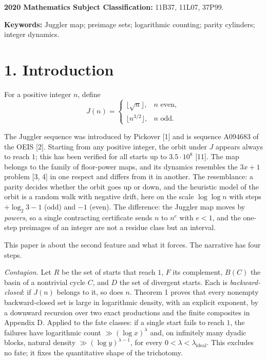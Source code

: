 \documentclass[11pt,a4paper]{article}
\begin{document}
\textbf{2020 Mathematics Subject Classification:} 11B37, 11L07, 37P99.

\textbf{Keywords:} Juggler map; preimage sets; logarithmic counting;
parity cylinders; integer dynamics.

\section{1. Introduction}\label{introduction}

For a positive integer \(n\), define \[
J(n)=\begin{cases}
\lfloor\sqrt n\rfloor,&n\text{ even},\\
\lfloor n^{3/2}\rfloor,&n\text{ odd}.
\end{cases}
\]

The Juggler sequence was introduced by Pickover {[}1{]} and is sequence
A094683 of the OEIS {[}2{]}. Starting from any positive integer, the
orbit under \(J\) appears always to reach \(1\); this has been verified
for all starts up to \(3.5\cdot 10^8\) {[}11{]}. The map belongs to the
family of floor-power maps, and its dynamics resembles the \(3x+1\)
problem {[}3, 4{]} in one respect and differs from it in another. The
resemblance: a parity decides whether the orbit goes up or down, and the
heuristic model of the orbit is a random walk with negative drift, here
on the scale \(\log\log n\) with steps \(+\log_2 3-1\) (odd) and \(-1\)
(even). The difference: the Juggler map moves by \emph{powers}, so a
single contracting certificate sends \(n\) to \(n^{e}\) with \(e<1\),
and the one-step preimages of an integer are not a residue class but an
interval.

This paper is about the second feature and what it forces. The narrative
has four steps.

\emph{Contagion.} Let \(R\) be the set of starts that reach \(1\), \(F\)
its complement, \(B(C)\) the basin of a nontrivial cycle \(C\), and
\(D\) the set of divergent starts. Each is \emph{backward-closed}: if
\(J(n)\) belongs to it, so does \(n\). Theorem 1 proves that every
nonempty backward-closed set is large in logarithmic density, with an
explicit exponent, by a downward recursion over two exact productions
and the finite composites in Appendix D. Applied to the fate classes: if
a single start fails to reach \(1\), the failures have logarithmic count
\(\gg(\log x)^\lambda\) and, on infinitely many dyadic blocks, natural
density \(\gg(\log y)^{\lambda-1}\), for every
\(0<\lambda<\lambda_{\mathrm{ideal}}\). This excludes no fate; it fixes
the quantitative shape of the trichotomy.
\end{document}
